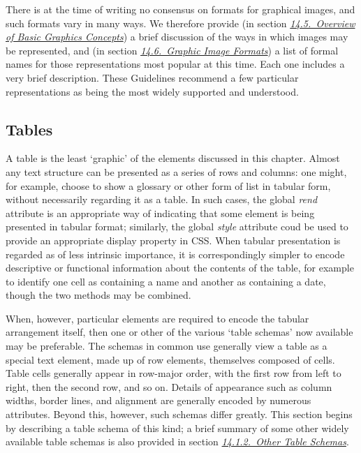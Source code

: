 There is at the time of writing no consensus on formats for graphical images, and such formats vary in many ways. We therefore provide (in section \textit{\hyperref[FTGROV]{14.5.\ Overview of Basic Graphics Concepts}}) a brief discussion of the ways in which images may be represented, and (in section \textit{\hyperref[FTGRNO]{14.6.\ Graphic Image Formats}}) a list of formal names for those representations most popular at this time. Each one includes a very brief description. These Guidelines recommend a few particular representations as being the most widely supported and understood.
\subsection[{Tables}]{Tables}\label{FTTAB}\par
A table is the least ‘graphic’ of the elements discussed in this chapter. Almost any text structure can be presented as a series of rows and columns: one might, for example, choose to show a glossary or other form of list in tabular form, without necessarily regarding it as a table. In such cases, the global {\itshape rend} attribute is an appropriate way of indicating that some element is being presented in tabular format; similarly, the global {\itshape style} attribute coud be used to provide an appropriate display property in CSS. When tabular presentation is regarded as of less intrinsic importance, it is correspondingly simpler to encode descriptive or functional information about the contents of the table, for example to identify one cell as containing a name and another as containing a date, though the two methods may be combined.\par
When, however, particular elements are required to encode the tabular arrangement itself, then one or other of the various ‘table schemas’ now available may be preferable. The schemas in common use generally view a table as a special text element, made up of row elements, themselves composed of cells. Table cells generally appear in row-major order, with the first row from left to right, then the second row, and so on. Details of appearance such as column widths, border lines, and alignment are generally encoded by numerous attributes. Beyond this, however, such schemas differ greatly. This section begins by describing a table schema of this kind; a brief summary of some other widely available table schemas is also provided in section \textit{\hyperref[FTTAB2]{14.1.2.\ Other Table Schemas}}.
